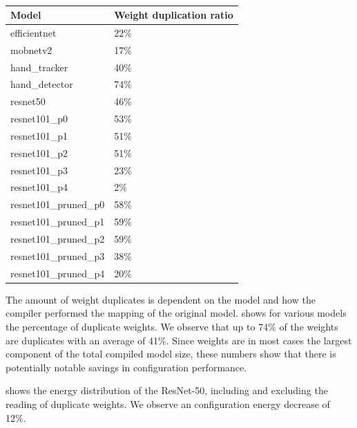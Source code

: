 \begin{table}[hbtp]
\centering
\begin{tabular}{@{}ll@{}}
\toprule
\textbf{Model}          & \textbf{Weight duplication ratio} \\ \midrule
efficientnet            & 22\%                              \\
mobnetv2                & 17\%                              \\
hand\_tracker           & 40\%                              \\
hand\_detector          & 74\%                              \\
resnet50                & 46\%                              \\
resnet101\_p0           & 53\%                              \\
resnet101\_p1           & 51\%                              \\
resnet101\_p2           & 51\%                              \\
resnet101\_p3           & 23\%                              \\
resnet101\_p4           & 2\%                               \\
resnet101\_pruned\_p0   & 58\%                              \\
resnet101\_pruned\_p1   & 59\%                              \\
resnet101\_pruned\_p2   & 59\%                              \\
resnet101\_pruned\_p3   & 38\%                              \\
resnet101\_pruned\_p4   & 20\%                              \\ \bottomrule
\end{tabular}
\caption{}
\label{tab:example_models_duplicate_weights}
\end{table}

The amount of weight duplicates is dependent on the model and how the compiler performed the mapping of the original model.
 shows for various models the percentage of duplicate weights.
We observe that up to 74\% of the weights are duplicates with an average of 41\%.
Since weights are in most cases the largest component of the total compiled model size, these numbers show that there is potentially notable savings in configuration performance.

 shows the energy distribution of the ResNet-50, including and excluding the reading of duplicate weights. 
We observe an configuration energy decrease of 12\%.

